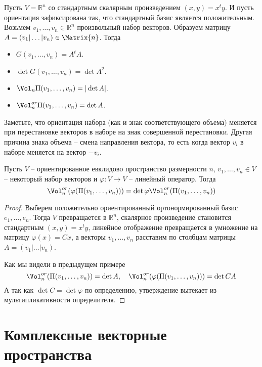 Пусть $V = \mathbb R^n$ со стандартным скалярным произведением $(x, y) = x^t y$.
И пусть ориентация зафиксирована так, что стандартный базис является положительным.
Возьмем $v_1,\ldots,v_n\in \mathbb R^n$ произвольный набор векторов.
Образуем матрицу $A = (v_1|\ldots|v_n)\in \Matrix{n}$.
Тогда 
\begin{itemize}
\item $G(v_1,\ldots,v_n) = A^t A$.

\item $\det G(v_1,\ldots,v_n) = \det A^2$.

\item $\Vol_n\Pi(v_1,\ldots,v_n) = |\det A|$.

\item $\Vol^{or}_n\Pi(v_1,\ldots,v_n) = \det A$.
\end{itemize}
Заметьте, что ориентация набора (как и знак соответствующего объема) меняется при перестановке векторов в наборе на знак совершенной перестановки.
Другая причина знака объема -- смена направления вектора, то есть когда вектор $v_i$ в наборе меняется на вектор $-v_i$.

\begin{claim}
Пусть $V$ -- ориентированное евклидово пространство размерности $n$, $v_1,\ldots,v_n\in V$ -- некоторый набор векторов и $\varphi\colon V\to V$ -- линейный оператор.
Тогда 
\[
\Vol^{or}_n(\varphi(\Pi(v_1,\ldots,v_n))) = \det \varphi \Vol^{or}_n(\Pi(v_1,\ldots,v_n))
\]
\end{claim}
\begin{proof}
Выберем положительно ориентированный ортонормированный базис $e_1,\ldots,e_n$.
Тогда $V$ превращается в $\mathbb R^n$, скалярное произведение становится стандартным $(x, y) = x^t y$, линейное отображение превращается в умножение на матрицу $\varphi(x) = Cx$, а векторы $v_1,\ldots,v_n$ расставим по столбцам матрицы $A = (v_1|\ldots|v_n)$.

Как мы видели в предыдущем примере
\[
\Vol^{or}_n(\Pi(v_1,\ldots,v_n)) = \det A,\quad
\Vol^{or}_n(\varphi(\Pi(v_1,\ldots,v_n))) = \det CA
\]
А так как $\det C = \det \varphi$ по определению, утверждение вытекает из мультипликативности определителя.
\end{proof}


\newpage
\section{Комплексные векторные пространства}

